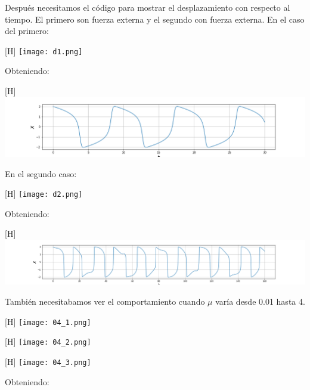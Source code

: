 \documentclass{article}
\begin{document}
Después necesitamos el código para mostrar el desplazamiento con respecto al tiempo. El primero son fuerza externa y el segundo con fuerza externa. En el caso del primero:\\
\begin{center}[H]
	\centering
    \texttt{[image: d1.png]}
\end{center}
Obteniendo:\\
\begin{center}[H]
	\centering
    \includegraphics[width=\linewidth]{TerceraFig.png}
\end{center}
En el segundo caso:\\
\begin{center}[H]
	\centering
    \texttt{[image: d2.png]}
\end{center}
Obteniendo:\\
\begin{center}[H]
	\centering
    \includegraphics[width=\linewidth]{CuartaFig.png}
\end{center}
También necesitabamos ver el comportamiento cuando $\mu$ varía desde 0.01 hasta 4. 
\begin{center}[H]
	\centering
    \texttt{[image: 04\_1.png]}
\end{center}
\begin{center}[H]
	\centering
    \texttt{[image: 04\_2.png]}
\end{center}
\begin{center}[H]
	\centering
    \texttt{[image: 04\_3.png]}
\end{center}
Obteniendo:\\
\end{document}
